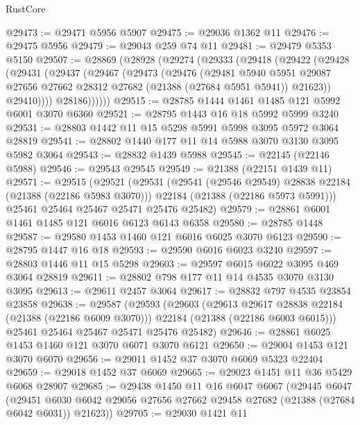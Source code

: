 \begin{lexlean}{RustCore}
\begin{coremodule}
@29473 := @29471 @5956 @5907
@29475 := @29036 @1362 @11
@29476 := @29475 @5956
@29479 := @29043 @259 @74 @11
@29481 := @29479 @5353 @5150
@29507 := @28869
    (@28928
      (@29274
        (@29333
          (@29418
            (@29422
              (@29428
                (@29431
                  (@29437
                    (@29467
                      (@29473
                        (@29476
                          (@29481
                            @5940
                            @5951
                            @29087
                            @27656
                            @27662
                            @28312
                            @27682
                            (@21388 (@27684 @5951 @5941))
                            @21623))
                        @29410))))
                @28186))))))
@29515 := @28785 @1444 @1461 @1485 @121 @5992 @6001 @3070 @6360
@29521 := @28795 @1443 @16 @18 @5992 @5999 @3240
@29531 := @28803 @1442 @11 @15 @5298 @5991 @5998 @3095 @5972 @3064 @28819
@29541 := @28802 @1440 @177 @11 @14 @5988 @3070 @3130 @3095 @5982 @3064
@29543 := @28832 @1439 @5988
@29545 := @22145 (@22146 @5988)
@29546 := @29543 @29545
@29549 := @21388 (@22151 @1439 @11)
@29571 := @29515
    (@29521
      (@29531
        (@29541 (@29546 @29549) @28838 @22184 (@21388 (@22186 @5983 @3070)))
        @22184
        (@21388 (@22186 @5973 @5991)))
      @25461
      @25464
      @25467
      @25471
      @25476
      @25482)
@29579 := @28861 @6001 @1461 @1485 @121 @6016 @6123 @6143 @6358
@29580 := @28785 @1448
@29587 := @29580 @1453 @1460 @121 @6016 @6025 @3070 @6123
@29590 := @28795 @1447 @16 @18
@29593 := @29590 @6016 @6023 @3240
@29597 := @28803 @1446 @11 @15 @5298
@29603 := @29597 @6015 @6022 @3095 @469 @3064 @28819
@29611 := @28802 @798 @177 @11 @14 @4535 @3070 @3130 @3095
@29613 := @29611 @2457 @3064
@29617 := @28832 @797 @4535 @23854 @23858
@29638 := @29587
    (@29593
      (@29603
        (@29613 @29617 @28838 @22184 (@21388 (@22186 @6009 @3070)))
        @22184
        (@21388 (@22186 @6003 @6015)))
      @25461
      @25464
      @25467
      @25471
      @25476
      @25482)
@29646 := @28861 @6025 @1453 @1460 @121 @3070 @6071 @3070 @6121
@29650 := @29004 @1453 @121 @3070 @6070
@29656 := @29011 @1452 @37 @3070 @6069 @5323 @22404
@29659 := @29018 @1452 @37 @6069
@29665 := @29023 @1451 @11 @36 @5429 @6068 @28907
@29685 := @29438
    @1450
    @11
    @16
    @6047
    @6067
    (@29445
      @6047
      (@29451 @6030 @6042 @29056 @27656 @27662 @29458 @27682 (@21388 (@27684 @6042 @6031)) @21623))
@29705 := @29030
    @1421
    @11

\end{coremodule}
\end{lexlean}
